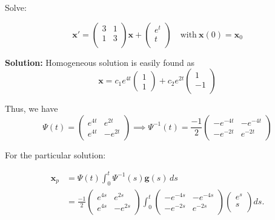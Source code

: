 \documentclass[10pt,landscape]{article}
\newcommand{\mbf}{\mathbf}
\begin{document}
\begin{multicols}{2}
Solve: 

$$\mbf{x}' = \begin{pmatrix}
    3& 1\\
    1 & 3\\
\end{pmatrix}\mbf{x} +\begin{pmatrix}
    e^t\\
    t\\
\end{pmatrix} \quad \text{with} \ \mbf{x}(0) = \mbf{x}_0$$



\textbf{Solution:}  Homogeneous solution is easily found as \\$$\mbf{x} = c_1e^{4t}\begin{pmatrix}
    1\\
    1
\end{pmatrix} + c_2 e^{2t}\begin{pmatrix}
    1\\
    -1\\
\end{pmatrix}$$

Thus, we have \\$$\Psi(t) = \begin{pmatrix}
    e^{4t} & e^{2t}\\
    e^{4t} & -e^{2t}
\end{pmatrix} \implies \Psi^{-1}(t) = \frac{-1}{2}\begin{pmatrix}
    -e^{-4t} & -e^{-4t}\\
    -e^{-2t} & e^{-2t}
\end{pmatrix}$$

\bigskip

For the particular solution: 

\begin{align*}
    \mathbf{x}_{p} &= \Psi(t) \int_0^t \Psi^{-1}(s)\mathbf{g}(s)\, ds \\
    &= \frac{-1}{2}\begin{pmatrix}
    e^{4s} & e^{2s} \\
    e^{4s} & -e^{2s}
    \end{pmatrix}\int_0^t \begin{pmatrix}
    -e^{-4s} & -e^{-4s}\\
    -e^{-2s} & e^{-2s}
\end{pmatrix}\begin{pmatrix}
    e^s\\
    s\\
\end{pmatrix} ds.
\end{align*}


\end{multicols}
\end{document}
